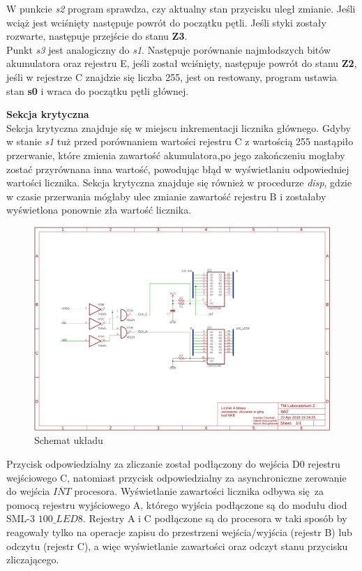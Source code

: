 \documentclass[fleqn]{article}
\begin{document}
W punkcie \textit{s2} program sprawdza, czy aktualny stan przycisku uległ zmianie. Jeśli wciąż jest wciśnięty następuje powrót do początku pętli. Jeśli styki zostały rozwarte, następuje przejście do stanu \textbf{Z3}.\\
Punkt \textit{s3} jest analogiczny do \textit{s1}. Następuje porównanie najmłodszych bitów akumulatora oraz rejestru E, jeśli został wciśnięty, następuje powrót do stanu \textbf{Z2}, jeśli w rejestrze C znajdzie się liczba 255, jest on restowany, program ustawia stan \textbf{s0} i wraca do początku pętli głównej.

\textbf{Sekcja krytyczna}
\\
Sekcja krytyczna znajduje się w miejscu inkrementacji licznika głównego. Gdyby w stanie \textit{s1} tuż przed porównaniem wartości rejestru C z wartością 255 nastąpiło przerwanie, które zmienia zawartość akumulatora,po jego zakończeniu mogłaby zostać przyrównana inna wartość, powodując błąd w wyświetlaniu odpowiedniej wartości licznika. Sekcja krytyczna znajduje się również w procedurze \textit{disp}, gdzie w czasie przerwania mógłaby ulec zmianie zawartość rejestru B i zostałaby wyświetlona ponownie zła wartość licznika.
\begin{figure}[H]
	\centering
	\includegraphics[width=\textwidth]{img/schematic.pdf}
	\caption{Schemat układu}
	\label{fig:schematic}
\end{figure}


Przycisk odpowiedzialny za zliczanie został podłączony do wejścia D0 rejestru wejściowego C, natomiast przycisk odpowiedzialny za asynchroniczne zerowanie do wejścia $\overline{INT}$ procesora.
Wyświetlanie zawartości licznika odbywa się za pomocą rejestru wyjściowego A, którego wyjścia podłączone są do modułu diod SML-3 $\textit{100\_LED8}$. Rejestry A i C podłączone są do procesora w taki sposób by reagowały tylko na operacje zapisu do przestrzeni wejścia/wyjścia (rejestr B) lub odczytu (rejestr C), a więc wyświetlanie zawartości oraz odczyt stanu przycisku zliczającego.
\end{document}
